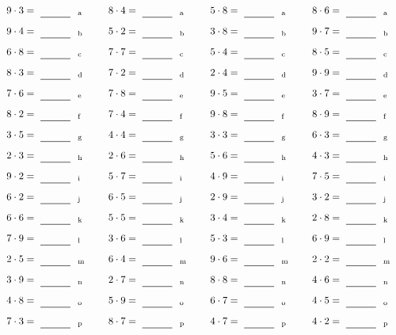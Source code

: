 \documentclass
[
  draft    = true,
  fontsize = 11pt,
  parskip  = half-
]
{scrartcl}
\begin{document}
\par\vfill\par
\begin{align*}
    \pline{9\cdot3}&=\rline{a}
  & \pline{8\cdot4}&=\rline{a}
  & \pline{5\cdot8}&=\rline{a}
  & \pline{8\cdot6}&=\rline{a} \\[1ex]
    \pline{9\cdot4}&=\rline{b}
  & \pline{5\cdot2}&=\rline{b}
  & \pline{3\cdot8}&=\rline{b}
  & \pline{9\cdot7}&=\rline{b} \\[1ex]
    \pline{6\cdot8}&=\rline{c}
  & \pline{7\cdot7}&=\rline{c}
  & \pline{5\cdot4}&=\rline{c}
  & \pline{8\cdot5}&=\rline{c} \\[1ex]
    \pline{8\cdot3}&=\rline{d}
  & \pline{7\cdot2}&=\rline{d}
  & \pline{2\cdot4}&=\rline{d}
  & \pline{9\cdot9}&=\rline{d} \\[1ex]
    \pline{7\cdot6}&=\rline{e}
  & \pline{7\cdot8}&=\rline{e}
  & \pline{9\cdot5}&=\rline{e}
  & \pline{3\cdot7}&=\rline{e} \\[1ex]
    \pline{8\cdot2}&=\rline{f}
  & \pline{7\cdot4}&=\rline{f}
  & \pline{9\cdot8}&=\rline{f}
  & \pline{8\cdot9}&=\rline{f} \\[1ex]
    \pline{3\cdot5}&=\rline{g}
  & \pline{4\cdot4}&=\rline{g}
  & \pline{3\cdot3}&=\rline{g}
  & \pline{6\cdot3}&=\rline{g} \\[1ex]
    \pline{2\cdot3}&=\rline{h}
  & \pline{2\cdot6}&=\rline{h}
  & \pline{5\cdot6}&=\rline{h}
  & \pline{4\cdot3}&=\rline{h} \\[1ex]
    \pline{9\cdot2}&=\rline{i}
  & \pline{5\cdot7}&=\rline{i}
  & \pline{4\cdot9}&=\rline{i}
  & \pline{7\cdot5}&=\rline{i} \\[1ex]
    \pline{6\cdot2}&=\rline{j}
  & \pline{6\cdot5}&=\rline{j}
  & \pline{2\cdot9}&=\rline{j}
  & \pline{3\cdot2}&=\rline{j} \\[1ex]
    \pline{6\cdot6}&=\rline{k}
  & \pline{5\cdot5}&=\rline{k}
  & \pline{3\cdot4}&=\rline{k}
  & \pline{2\cdot8}&=\rline{k} \\[1ex]
    \pline{7\cdot9}&=\rline{l}
  & \pline{3\cdot6}&=\rline{l}
  & \pline{5\cdot3}&=\rline{l}
  & \pline{6\cdot9}&=\rline{l} \\[1ex]
    \pline{2\cdot5}&=\rline{m}
  & \pline{6\cdot4}&=\rline{m}
  & \pline{9\cdot6}&=\rline{m}
  & \pline{2\cdot2}&=\rline{m} \\[1ex]
    \pline{3\cdot9}&=\rline{n}
  & \pline{2\cdot7}&=\rline{n}
  & \pline{8\cdot8}&=\rline{n}
  & \pline{4\cdot6}&=\rline{n} \\[1ex]
    \pline{4\cdot8}&=\rline{o}
  & \pline{5\cdot9}&=\rline{o}
  & \pline{6\cdot7}&=\rline{o}
  & \pline{4\cdot5}&=\rline{o} \\[1ex]
    \pline{7\cdot3}&=\rline{p}
  & \pline{8\cdot7}&=\rline{p}
  & \pline{4\cdot7}&=\rline{p}
  & \pline{4\cdot2}&=\rline{p}
\end{align*}
\end{document}
